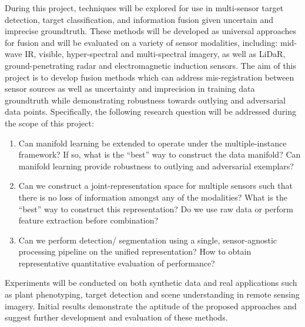 During this project, techniques will be explored for use in multi-sensor target detection, target classification, and information fusion given uncertain and imprecise groundtruth.  These methods will be developed as universal approaches for fusion and will be evaluated on a variety of sensor modalities, including: mid-wave IR, visible, hyper-spectral and multi-spectral imagery, as well as LiDaR, ground-penetrating radar and electromagnetic induction sensors.  The aim of this project is to develop fusion methods which can address mis-registration between sensor sources as well as uncertainty and imprecision in training data groundtruth while demonstrating robustness towards outlying and adversarial data points. Specifically, the following research question will be addressed during the scope of this project:
\begin{enumerate}
	\item Can manifold learning be extended to operate under the multiple-instance framework? If so, what is the ``best'' way to construct the data manifold?  Can manifold learning provide robustness to outlying and adversarial exemplars?
	\item Can we construct a joint-representation space for multiple sensors such that there is no loss of information amongst any of the modalities?  What is the ``best'' way to construct this representation?  Do we use raw data or perform feature extraction before combination?
	\item Can we perform detection/ segmentation using a single, sensor-agnostic processing pipeline on the unified representation?  How to obtain representative quantitative evaluation of performance?
\end{enumerate} 

Experiments will be conducted on both synthetic data and real applications such as plant phenotyping, target detection and scene understanding in remote sensing imagery. Initial results demonstrate the aptitude of the proposed approaches and suggest further development and evaluation of these methods.
